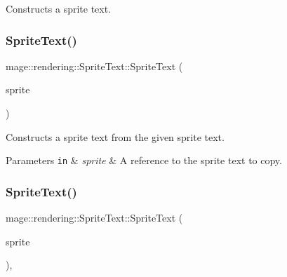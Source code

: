Constructs a sprite text. \hypertarget{classmage_1_1rendering_1_1_sprite_text_a60b40732c1a08b88b70335cf91947556}{}\label{classmage_1_1rendering_1_1_sprite_text_a60b40732c1a08b88b70335cf91947556} 
\subsubsection{\texorpdfstring{Sprite\+Text()}{SpriteText()}\hspace{0.1cm}{\footnotesize\ttfamily [2/3]}}
{\footnotesize\ttfamily mage\+::rendering\+::\+Sprite\+Text\+::\+Sprite\+Text (\begin{DoxyParamCaption}\item[{const \hyperlink{classmage_1_1rendering_1_1_sprite_text}{Sprite\+Text} \&}]{sprite }\end{DoxyParamCaption})\hspace{0.3cm}{\ttfamily [default]}}

Constructs a sprite text from the given sprite text.


\begin{DoxyParams}[1]{Parameters}
\mbox{\tt in}  & {\em sprite} & A reference to the sprite text to copy. \\
\hline
\end{DoxyParams}
\hypertarget{classmage_1_1rendering_1_1_sprite_text_ad2bdddde8371d59c85449a9979017f8c}{}\label{classmage_1_1rendering_1_1_sprite_text_ad2bdddde8371d59c85449a9979017f8c} 
\subsubsection{\texorpdfstring{Sprite\+Text()}{SpriteText()}\hspace{0.1cm}{\footnotesize\ttfamily [3/3]}}
{\footnotesize\ttfamily mage\+::rendering\+::\+Sprite\+Text\+::\+Sprite\+Text (\begin{DoxyParamCaption}\item[{\hyperlink{classmage_1_1rendering_1_1_sprite_text}{Sprite\+Text} \&\&}]{sprite }\end{DoxyParamCaption})\hspace{0.3cm}{\ttfamily [default]}, {\ttfamily [noexcept]}}

